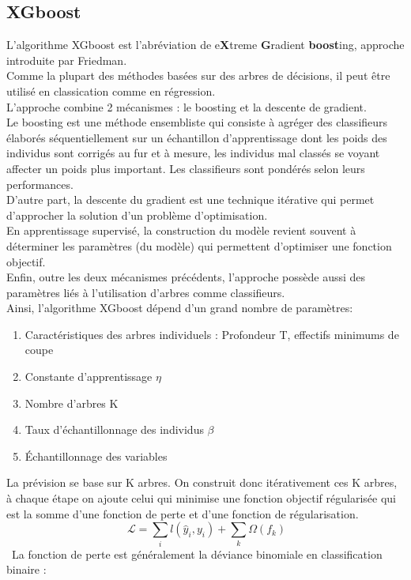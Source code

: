 \documentclass[french]{article}
\begin{document}
\begin{multicols}{2}
\subsection{XGboost}
L’algorithme XGboost est l'abréviation de e\textbf{X}treme \textbf{G}radient \textbf{boost}ing, approche introduite par Friedman.\\
Comme la plupart des méthodes basées sur des arbres de décisions, il peut être utilisé en classication comme en régression.\\
L'approche combine 2 mécanismes : le boosting et la descente de gradient.\\
Le boosting est une méthode ensembliste qui consiste à agréger des classifieurs élaborés séquentiellement sur un échantillon d’apprentissage dont les poids des individus sont corrigés au fur et à mesure, les individus mal classés se voyant affecter un poids plus important. Les classifieurs sont pondérés selon leurs performances.\\
D'autre part, la descente du gradient est une technique itérative qui permet d’approcher la solution d’un problème d’optimisation.\\
En apprentissage supervisé, la construction du modèle revient souvent à déterminer les paramètres (du modèle) qui permettent d’optimiser une fonction objectif.\\
Enfin, outre les deux mécanismes précédents, l’approche possède aussi des paramètres liés à l’utilisation d’arbres comme classifieurs.\\
Ainsi, l’algorithme XGboost dépend d’un grand nombre de paramètres: 
\begin{enumerate}
    \item Caractéristiques des
arbres individuels : Profondeur T, effectifs minimums de coupe 
\item Constante
d'apprentissage $\eta$
\item Nombre d'arbres K
\item Taux d'échantillonnage des individus $\beta$
\item Échantillonnage des variables
\end{enumerate}
La prévision se base sur K arbres. On construit donc itérativement ces K arbres, à chaque étape on ajoute celui qui minimise une fonction objectif régularisée qui est la somme d'une fonction de perte et d'une fonction de régularisation.\\
\[\ \mathcal{L}=\sum_{i} l\left(\hat{y}_{i}, y_{i}\right)+\sum_{k} \Omega\left(f_{k}\right) \]\
La fonction de perte est généralement la déviance binomiale en classification binaire :\\

\end{multicols}
\end{document}
